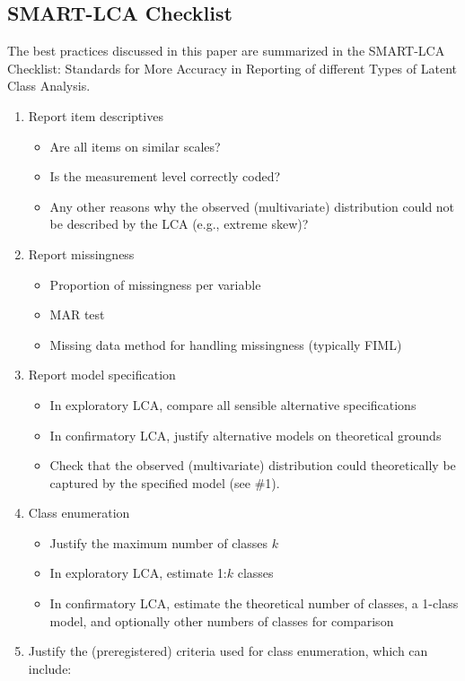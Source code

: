 \documentclass[
  ,man,floatsintext]{apa6}
\providecommand{\tightlist}{%
  \setlength{\itemsep}{0pt}\setlength{\parskip}{0pt}}
\begin{document}
\hypertarget{smart-lca-checklist}{%
\subsection{SMART-LCA Checklist}\label{smart-lca-checklist}}

The best practices discussed in this paper are summarized in the SMART-LCA Checklist: Standards for More Accuracy in Reporting of different Types of Latent Class Analysis.

\begin{enumerate}
\def\labelenumi{\arabic{enumi}.}
\tightlist
\item
  Report item descriptives

  \begin{itemize}
  \tightlist
  \item
    Are all items on similar scales?
  \item
    Is the measurement level correctly coded?
  \item
    Any other reasons why the observed (multivariate) distribution could not be described by the LCA (e.g., extreme skew)?
  \end{itemize}
\item
  Report missingness

  \begin{itemize}
  \tightlist
  \item
    Proportion of missingness per variable
  \item
    MAR test
  \item
    Missing data method for handling missingness (typically FIML)
  \end{itemize}
\item
  Report model specification

  \begin{itemize}
  \tightlist
  \item
    In exploratory LCA, compare all sensible alternative specifications
  \item
    In confirmatory LCA, justify alternative models on theoretical grounds
  \item
    Check that the observed (multivariate) distribution could theoretically be captured by the specified model (see \#1).
  \end{itemize}
\item
  Class enumeration

  \begin{itemize}
  \tightlist
  \item
    Justify the maximum number of classes \(k\)
  \item
    In exploratory LCA, estimate 1:\(k\) classes
  \item
    In confirmatory LCA, estimate the theoretical number of classes, a 1-class model, and optionally other numbers of classes for comparison
  \end{itemize}
\item
  Justify the (preregistered) criteria used for class enumeration, which can include:


\end{enumerate}
\end{document}
